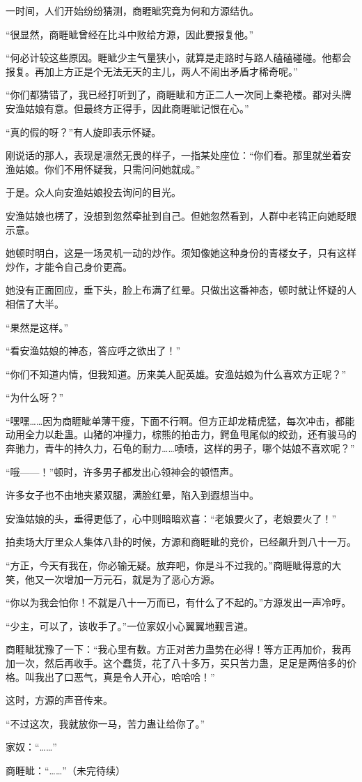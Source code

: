 \begin{this_body}
一时间，人们开始纷纷猜测，商睚眦究竟为何和方源结仇。

“很显然，商睚眦曾经在比斗中败给方源，因此要报复他。”

“何必计较这些原因。睚眦少主气量狭小，就算是走路时与路人磕磕碰碰。他都会报复。再加上方正是个无法无天的主儿，两人不闹出矛盾才稀奇呢。”

“你们都猜错了，我已经打听到了，商睚眦和方正二人一次同上秦艳楼。都对头牌安渔姑娘有意。但最终方正得手，因此商睚眦记恨在心。”

“真的假的呀？”有人旋即表示怀疑。

刚说话的那人，表现是凛然无畏的样子，一指某处座位：“你们看。那里就坐着安渔姑娘。你们不用怀疑我，只需问问她就成。”

于是。众人向安渔姑娘投去询问的目光。

安渔姑娘也楞了，没想到忽然牵扯到自己。但她忽然看到，人群中老鸨正向她眨眼示意。

她顿时明白，这是一场灵机一动的炒作。须知像她这种身份的青楼女子，只有这样炒作，才能令自己身价更高。

她没有正面回应，垂下头，脸上布满了红晕。只做出这番神态，顿时就让怀疑的人相信了大半。

“果然是这样。”

“看安渔姑娘的神态，答应呼之欲出了！”

“你们不知道内情，但我知道。历来美人配英雄。安渔姑娘为什么喜欢方正呢？”

“为什么呀？”

“嘿嘿……因为商睚眦单薄干瘦，下面不行啊。但方正却龙精虎猛，每次冲击，都能动用全力以赴蛊。山猪的冲撞力，棕熊的拍击力，鳄鱼甩尾似的绞劲，还有骏马的奔驰力，青牛的持久力，石龟的耐力……啧啧，这样的男子，哪个姑娘不喜欢呢？”

“哦——！”顿时，许多男子都发出心领神会的顿悟声。

许多女子也不由地夹紧双腿，满脸红晕，陷入到遐想当中。

安渔姑娘的头，垂得更低了，心中则暗暗欢喜：“老娘要火了，老娘要火了！”

拍卖场大厅里众人集体八卦的时候，方源和商睚眦的竞价，已经飙升到八十一万。

“方正，今天有我在，你必输无疑。放弃吧，你是斗不过我的。”商睚眦得意的大笑，他又一次增加一万元石，就是为了恶心方源。

“你以为我会怕你！不就是八十一万而已，有什么了不起的。”方源发出一声冷哼。

“少主，可以了，该收手了。”一位家奴小心翼翼地觐言道。

商睚眦犹豫了一下：“我心里有数。方正对苦力蛊势在必得！等方正再加价，我再加一次，然后再收手。这个蠢货，花了八十多万，买只苦力蛊，足足是两倍多的价格。叫我出了口恶气，真是令人开心，哈哈哈！”

这时，方源的声音传来。

“不过这次，我就放你一马，苦力蛊让给你了。”

家奴：“……”

商睚眦：“……”（未完待续）

\end{this_body}

